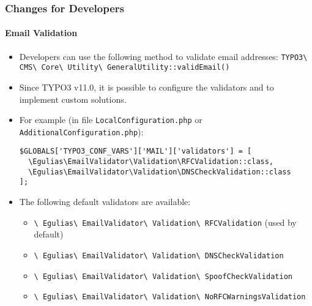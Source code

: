 %

\begin{frame}[fragile]
	\frametitle{Changes for Developers}
	\framesubtitle{Email Validation}

	\begin{itemize}
		\item Developers can use the following method to validate email addresses:
			\newline\small
				\texttt{TYPO3\textbackslash
					CMS\textbackslash
					Core\textbackslash
					Utility\textbackslash
					GeneralUtility::validEmail()}\normalsize

		\item Since TYPO3 v11.0, it is possible to configure the validators
			and to implement custom solutions.

		\item For example (in file \texttt{LocalConfiguration.php} or \texttt{AdditionalConfiguration.php}):
\begin{lstlisting}
$GLOBALS['TYPO3_CONF_VARS']['MAIL']['validators'] = [
  \Egulias\EmailValidator\Validation\RFCValidation::class,
  \Egulias\EmailValidator\Validation\DNSCheckValidation::class
];
\end{lstlisting}

		\item The following default validators are available:
			\begin{itemize}
				\item \texttt{\textbackslash
					Egulias\textbackslash
					EmailValidator\textbackslash
					Validation\textbackslash
					RFCValidation} (used by default)
				\item \texttt{\textbackslash
					Egulias\textbackslash
					EmailValidator\textbackslash
					Validation\textbackslash
					DNSCheckValidation}
				\item \texttt{\textbackslash
					Egulias\textbackslash
					EmailValidator\textbackslash
					Validation\textbackslash
					SpoofCheckValidation}
				\item \texttt{\textbackslash
					Egulias\textbackslash
					EmailValidator\textbackslash
					Validation\textbackslash
					NoRFCWarningsValidation}
			\end{itemize}
	\end{itemize}

\end{frame}

